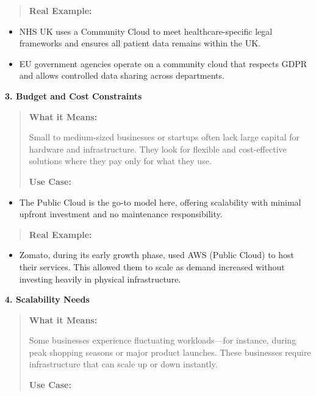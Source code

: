 \documentclass[12pt]{article}
\begin{document}
\begin{quote}
\textbf{Real Example:}
\end{quote}

\begin{itemize}
\item
  NHS UK uses a Community Cloud to meet healthcare-specific legal
  frameworks and ensures all patient data remains within the UK.
\item
  EU government agencies operate on a community cloud that respects GDPR
  and allows controlled data sharing across departments.
\end{itemize}

\textbf{3. Budget and Cost Constraints}

\begin{quote}
\textbf{What it Means:}

Small to medium-sized businesses or startups often lack large capital
for hardware and infrastructure. They look for flexible and
cost-effective solutions where they pay only for what they use.

\textbf{Use Case:}
\end{quote}

\begin{itemize}
\item
  The Public Cloud is the go-to model here, offering scalability with
  minimal upfront investment and no maintenance responsibility.
\end{itemize}

\begin{quote}
\textbf{Real Example:}
\end{quote}

\begin{itemize}
\item
  Zomato, during its early growth phase, used AWS (Public Cloud) to host
  their services. This allowed them to scale as demand increased without
  investing heavily in physical infrastructure.
\end{itemize}

\textbf{4. Scalability Needs}

\begin{quote}
\textbf{What it Means:}

Some businesses experience fluctuating workloads---for instance, during
peak shopping seasons or major product launches. These businesses
require infrastructure that can scale up or down instantly.

\textbf{Use Case:}
\end{quote}
\end{document}
